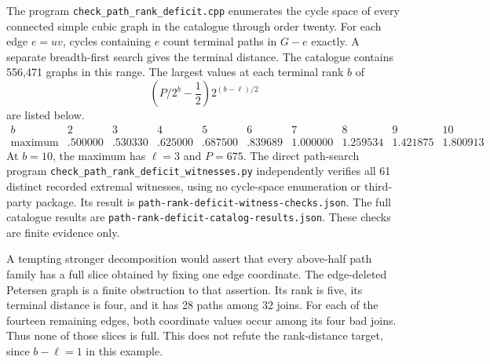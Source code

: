The program \texttt{check\_path\_rank\_deficit.cpp} enumerates the cycle space of every connected simple cubic graph in the catalogue through order twenty.
For each edge $e=uv$, cycles containing $e$ count terminal paths in $G-e$ exactly.
A separate breadth-first search gives the terminal distance.
The catalogue contains 556,471 graphs in this range.
The largest values at each terminal rank $b$ of
\[
 \left(P/2^b-\frac12\right)2^{(b-\ell)/2}
\]
are listed below.
\[
\begin{array}{c|rrrrrrrrr}
 b&2&3&4&5&6&7&8&9&10\\ \hline
 \text{maximum}&.500000&.530330&.625000&.687500&.839689&1.000000&1.259534&1.421875&1.800913
\end{array}
\]
At $b=10$, the maximum has $\ell=3$ and $P=675$.
The direct path-search program \texttt{check\_path\_rank\_deficit\_witnesses.py} independently verifies all 61 distinct recorded extremal witnesses, using no cycle-space enumeration or third-party package.
Its result is \texttt{path-rank-deficit-witness-checks.json}.
The full catalogue results are \texttt{path-rank-deficit-catalog-results.json}.
These checks are finite evidence only.

A tempting stronger decomposition would assert that every above-half path family has a full slice obtained by fixing one edge coordinate.
The edge-deleted Petersen graph is a finite obstruction to that assertion.
Its rank is five, its terminal distance is four, and it has 28 paths among 32 joins.
For each of the fourteen remaining edges, both coordinate values occur among its four bad joins.
Thus none of those slices is full.
This does not refute the rank-distance target, since $b-\ell=1$ in this example.
